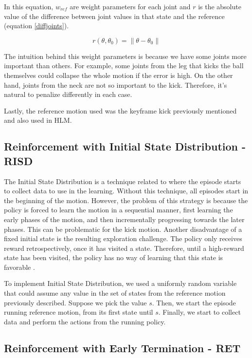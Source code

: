In this equation, $w_{ref}$ are weight parameters for each joint and $r$ is the absolute value of the difference between joint values in that state and the reference (equation \ref{diffjoints}).

\begin{equation}
r(\theta, \theta_{0}) = \lVert\theta - \theta_{0}\rVert
\label{diffjoints}
\end{equation}

The intuition behind this weight parameters is because we have some joints more important than others. For example, some joints from the leg that kicks the ball themselves could collapse the whole motion if the error is high. On the other hand, joints from the neck are not so important to the kick. Therefore, it's natural to penalize differently in each case.

Lastly, the reference motion used was the keyframe kick previously mentioned and also used in HLM.


\subsection{Reinforcement with Initial State Distribution - RISD}\label{risd}

The Initial State Distribution is a technique related to where the episode starts to collect data to use in the learning. Without this technique, all episodes start in the beginning of the motion. However, the problem of this strategy is because the policy is forced to learn the motion in a sequential manner, first learning the early phases of the motion, and then incrementally progressing towards the later phases. This can be problematic for the kick motion. Another disadvantage of a fixed initial state is the resulting exploration challenge. The policy only receives reward retrospectively, once it has visited a state. Therefore, until a high-reward state has been visited, the policy has no way of learning that this state is favorable \cite{peng2018}.

To implement Initial State Distribution, we used a uniformly random variable that could assume any value in the set of states from the reference motion previously described. Suppose we pick the value $s$. Then, we start the episode running reference motion, from its first state until $s$. Finally, we start to collect data and perform the actions from the running policy.

\subsection{Reinforcement with Early Termination - RET}

